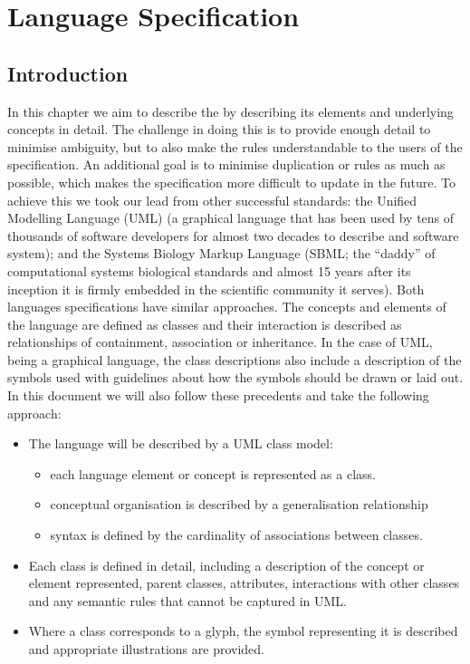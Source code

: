 

\chapter{Language Specification}
\label{chp:glyphs}

\section{Introduction}
\label{sec:lang-intro}

In this chapter we aim to describe the \PDl by describing its elements
and underlying concepts in detail. The challenge in doing this is to
provide enough detail to minimise ambiguity, but to also make the
rules understandable to the users of the specification. An additional
goal is to minimise duplication or rules as much as possible, which
makes the specification more difficult to update in the future. To
achieve this we took our lead from other successful standards: the
Unified Modelling Language (UML) \cite{umlspec} (a graphical
language that has been used by tens of thousands of software
developers for almost two decades to describe and software system); and the
Systems Biology Markup Language \cite{sbmll3core}  (SBML; the ``daddy'' of computational systems
biological standards and almost 15 years after its inception it is firmly
embedded in the scientific community it serves). Both languages
specifications have similar approaches. The concepts and elements of
the language are defined as classes and their interaction is described
as relationships of containment, association or inheritance. In the
case of UML, being a graphical language, the class descriptions also
include a description of the symbols used with guidelines about how
the symbols should be drawn or laid out. In this document we will also
follow these precedents and take the following approach:

\begin{itemize}
\item The language will be described by a UML class model:
  \begin{itemize}
  \item each language element or concept is represented as a
    class.
  \item conceptual organisation is described by a generalisation relationship
  \item syntax is defined by the cardinality of associations between classes.
  \end{itemize}
\item Each class is defined in detail, including a description of the concept or
  element represented, parent classes, attributes, interactions with
  other classes and any semantic rules that cannot be captured in UML.
\item Where a class corresponds to a glyph, the symbol representing it
  is described and appropriate illustrations are provided.
\end{itemize}


